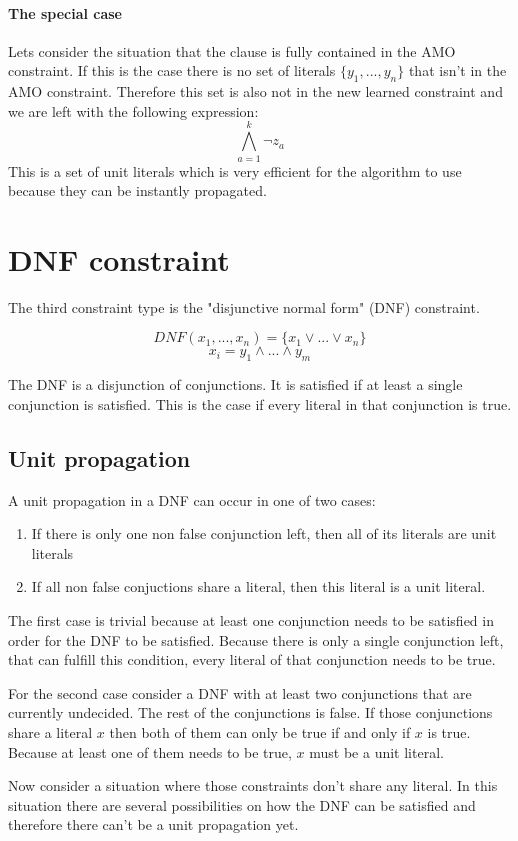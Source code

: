 \paragraph{The special case} Lets consider the situation that the clause is fully contained in the AMO constraint. If this is the case there is no set of literals $\{y_1,...,y_n\}$ that isn't in the AMO constraint. Therefore this set is also not in the new learned constraint and we are left with the following expression:
\begin{displaymath}
\bigwedge_{a=1}^{k}\neg z_a
\end{displaymath}
This is a set of unit literals which is very efficient for the algorithm to use because they can be instantly propagated.

\section{DNF constraint}
The third constraint type is the "disjunctive normal form" (DNF) constraint.
\begin{leftbar}
\begin{displaymath}
DNF(x_1,...,x_n) = \{x_1 \vee ... \vee x_n \}
\end{displaymath}
\begin{displaymath}
x_i = y_1 \wedge ... \wedge y_m
\end{displaymath}
\end{leftbar}
The DNF is a disjunction of conjunctions. It is satisfied if at least a single conjunction is satisfied. This is the case if every literal in that conjunction is true.

\subsection{Unit propagation}
A unit propagation in a DNF can occur in one of two cases:
\begin{leftbar}
\begin{enumerate}
\item If there is only one non false conjunction left, then all of its literals are unit literals
\item If all non false conjuctions share a literal, then this literal is a unit literal.
\end{enumerate}
\end{leftbar}
The first case is trivial because at least one conjunction needs to be satisfied in order for the DNF to be satisfied. Because there is only a single conjunction left, that can fulfill this condition, every literal of that conjunction needs to be true.
\par
For the second case consider a DNF with at least two conjunctions that are currently undecided. The rest of the conjunctions is false. If those conjunctions share a literal $x$ then both of them can only be true if and only if $x$ is true. Because at least one of them needs to be true, $x$ must be a unit literal.
\par
Now consider a situation where those constraints don't share any literal. In this situation there are several possibilities on how the DNF can be satisfied and therefore there can't  be a unit propagation yet.

